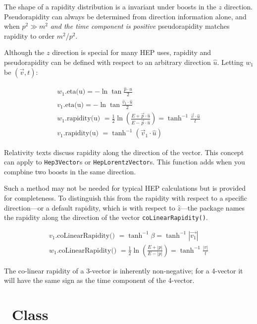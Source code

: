 \documentclass[twoside,12pt]{article}
\def \SV {{\tt Hep3Vector}}
\def \Ro {{\tt HepRotation}}
\def \LV {{\tt HepLorentzVector}}
\begin{document}
\noindent
The shape of a rapidity distribution is a invariant under boosts in the $z$
direction.
Pseudorapidity can always be determined from direction information alone,
and when $ p^2 \gg m^2 $ {\em and the time component is positive}
pseudorapidity matches rapidity to order $m^2$/$p^2$.

\vspace{.2 in}

Although the $z$ direction is special for many HEP uses,
rapidity and pseudorapidity can be defined with respect to an arbitrary
direction $\hat{u}$.  Letting $w_1$ be $(\vec{v}, t)$:

\begin{eqnarray}
\label{eq:weta:4}
  w_1 \mbox{.eta(u)} = - \ln \tan \frac{\hat{p} \cdot {u}}{2} \\
\label{eq:eta:4}
  v_1 \mbox{.eta(u)} = - \ln \tan \frac{\hat{v}_1 \cdot \hat{u}} {2} \\
\label{eq:wrapid:4}
  w_1 \mbox{.rapidity(u) }
	= \frac{1}{2} \ln \left( \frac{E + \vec{p} \cdot \hat{u}}
				      {E - \vec{p} \cdot \hat{u}} \right)
	= \tanh^{-1} \frac {\vec{v} \cdot \hat{u}} {t} \\
  v_1 \mbox{.rapidity(u) } = \tanh^{-1} (\vec{v}_{1} \cdot \hat{u})
\end{eqnarray}

\noindent
Relativity texts discuss rapidity along the direction of the vector.
This concept can apply to \SV s or \LV s.
This function adds when you compbine two boosts in the same direction.

Such a method may not be needed for typical HEP calculations but
is provided for completeness.
To distinguish this from the rapidity with respect to a specific
direction---or a default rapidity, which is with respect to $\hat{z}$---the
package names the rapidity along the direction of the vector
{\tt coLinearRapidity()}.

\begin{eqnarray}
  v_1 \mbox{.coLinearRapidity() } = \tanh^{-1} \beta
	=  \tanh^{-1} \left|\vec{v_1}\right| \\
\label{eq:wcoLinRap:2}
  w_1 \mbox{.coLinearRapidity() }
	= \frac{1}{2} \ln \left( \frac{E + |p|}{E - |p|}    \right)
	= \tanh^{-1} \frac {|v|}{t}
\end{eqnarray}

\noindent
The co-linear rapidity of a 3-vector is inherently non-negative; for a
4-vector it will have the same sign as the time component of the 4-vector.

\section{\protect\Ro\ Class}
\end{document}
